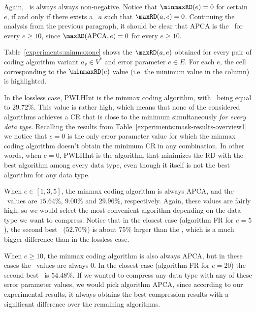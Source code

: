 \vspace{-3pt}
Again, \minmaxRD\ is always always non-negative. Notice that $\text{\minmaxRD}(e)=0$ for certain $e$, if and only if there exists a \minmaxca\ $a$ such that $\text{\maxRD}(a, e)=0$. Continuing the analysis from the previous paragraph, it should be clear that APCA is the \minmaxca\ for every $e \geq 10$, since $\text{\maxRD}(\text{APCA}, e)=0$ for every $e \geq 10$.


Table~\ref{experiments:minmaxone} shows the $\text{\maxRD}(a, e)$ obtained for every pair of coding algorithm variant $a_v \in V^*$ and error parameter $e \in E$. For each $e$, the cell corresponding to the $\text{\minmaxRD}(e)$ value (i.e. the minimum value in the column) is highlighted.
\vspace{+3pt}





In the lossless case, PWLHInt is the minmax coding algorithm, with \minmaxRD \ being equal to $29.72\%$. This value is rather high, which means that none of the considered algorithms achieves a CR that is close to the minimum simultaneously \textit{for every data type}. 
Recalling the results from Table~\ref{experiments:mask-results-overview1} we notice that $e=0$ is the only error parameter value for which the minmax coding algorithm doesn't obtain the minimum CR in any combination. In other words, when $e=0$, PWLHInt is the algorithm that minimizes the RD with the best algorithm among every data type, even though it itself is not the best algorithm for any data type.


When $e \in [1, 3, 5]$, the minmax coding algorithm is always APCA, and the \minmaxRD \ values are $15.64\%$, $9.00\%$ and $29.96\%$, respectively. Again, these values are fairly high, so we would select the most convenient algorithm depending on the data type we want to compress. 
Notice that in the closest case (algorithm FR for $e=5$), the second best \maxRD\ ($52.70\%$) is about $75\%$ larger than the \minmaxRD, which is a much bigger difference than in the lossless case.


When $e \geq 10$, the minmax coding algorithm is also always APCA, but in these cases the \minmaxRD \ values are always 0. In the closest case (algorithm FR for $e=20$) the second best \maxRD\ is $54.48\%$. If we wanted to compress any data type with any of these error parameter values, we would pick algorithm APCA, since according to our experimental results, it always obtains the best compression results with a significant difference over the remaining algorithms.

